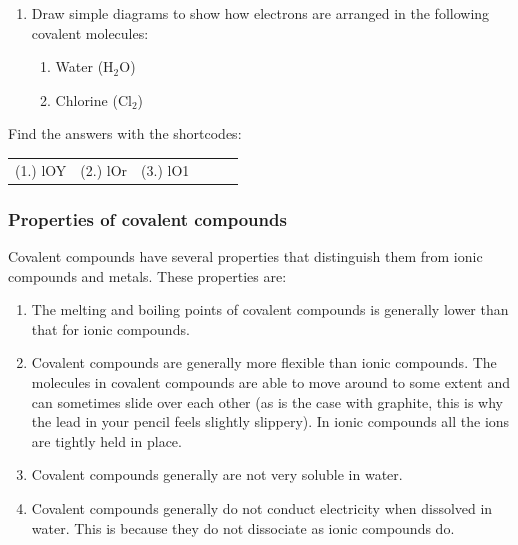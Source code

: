 \begin{enumerate}[noitemsep, label=\textbf{\arabic*}. ]
\begin{table}[H]
\begin{center}
\begin{xtabular}[t]{|l|l|l|l|}
    \end{xtabular}
      \end{center}
    \begin{center}{\small\bfseries Table 5.1}\end{center}
    \begin{caption}{\small\bfseries Table 5.1}\end{caption}
\end{table}
    \par
          \label{m38704*uid12}\item Draw simple diagrams to show how electrons are arranged in the following covalent molecules:
\label{m38704*id140030}\begin{enumerate}[noitemsep, label=\textbf{\alph*}. ] 
            \label{m38704*uid13}\item Water ($\mathrm{H}{}_{2}\mathrm{O}$)
\label{m38704*uid14}\item Chlorine ($\mathrm{Cl}{}_{2}$)
\end{enumerate}
                \end{enumerate}
      \label{m38704*eip-790}
\par {} Find the answers with the shortcodes:
 \par \begin{tabular}[h]{cccccc}
 (1.) lOY  &  (2.) lOr  &  (3.) lO1  & \end{tabular}
            \subsubsection{ Properties of covalent compounds}
            \nopagebreak
            \label{m38704*eip-541}
Covalent compounds have several properties that distinguish them from ionic compounds and metals. These properties are:
\label{m38704*di6325}\begin{enumerate}[noitemsep, label=\textbf{\arabic*}. ] 
            \item The melting and boiling points of covalent compounds is generally lower than that for ionic compounds.\item Covalent compounds are generally more flexible than ionic compounds. The molecules in covalent compounds are able to move around to some extent and can sometimes slide over each other (as is the case with graphite, this is why the lead in your pencil feels slightly slippery). In ionic compounds all the ions are tightly held in place.\item Covalent compounds generally are not very soluble in water.\item Covalent compounds generally do not conduct electricity when dissolved in water. This is because they do not dissociate as ionic compounds do.\end{enumerate}
\par 
  \label{m38704**end}
